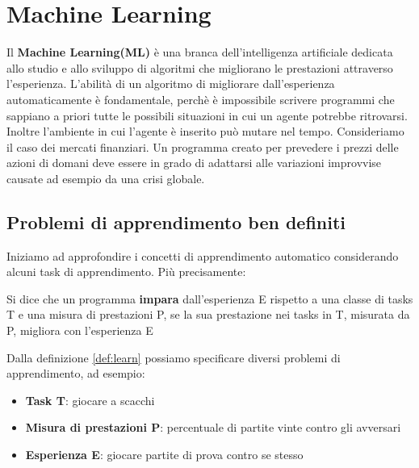 \section{Machine Learning}
Il \textbf{Machine Learning(ML)} è una branca dell'intelligenza artificiale dedicata allo studio e allo sviluppo
di algoritmi che migliorano le prestazioni attraverso l'esperienza\cite{mlwiki}. L'abilità di un algoritmo di migliorare dall'esperienza
automaticamente è fondamentale, perchè è impossibile scrivere programmi  che sappiano a priori tutte le possibili situazioni in cui 
un agente potrebbe ritrovarsi. Inoltre l'ambiente in cui l'agente è inserito può mutare nel tempo\cite{aima}. Consideriamo il caso dei mercati finanziari.
Un programma creato per prevedere i prezzi delle azioni di domani deve essere in grado  di adattarsi alle variazioni improvvise causate ad esempio
da una crisi globale.
\subsection{Problemi di apprendimento ben definiti}
Iniziamo ad approfondire i concetti di apprendimento automatico considerando alcuni task di apprendimento. Più precisamente:
\begin{defn}\label{def:learn}
  Si dice che un programma \textbf{impara} dall'esperienza E rispetto a una classe di tasks T e una misura di prestazioni P,
  se la sua prestazione nei tasks in T, misurata da P, migliora con l'esperienza E
\end{defn}
Dalla definizione \ref{def:learn} possiamo specificare diversi problemi di apprendimento, ad esempio\cite{Mitchell97}:
\begin{itemize}
  \item \textbf{Task T}: giocare a scacchi
  \item \textbf{Misura di prestazioni P}: percentuale di partite vinte contro gli avversari
  \item \textbf{Esperienza E}: giocare partite di prova contro se stesso
\end{itemize}


